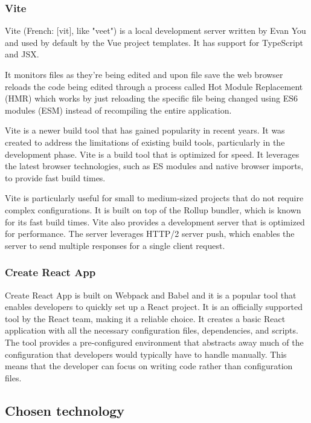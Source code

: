   \subsubsection*{Vite}
  Vite (French: [vit], like "veet") is a local development server written by Evan You and used by default by the Vue project templates. It has support for TypeScript and JSX.

  It monitors files as they're being edited and upon file save the web browser reloads the code being edited through a process called Hot Module Replacement (HMR) which works by just reloading the specific file being changed using ES6 modules (ESM) instead of recompiling the entire application.

  Vite is a newer build tool that has gained popularity in recent years. It was created to address the limitations of existing build tools, particularly in the development phase. Vite is a build tool that is optimized for speed. It leverages the latest browser technologies, such as ES modules and native browser imports, to provide fast build times.

  Vite is particularly useful for small to medium-sized projects that do not require complex configurations. It is built on top of the Rollup bundler, which is known for its fast build times. Vite also provides a development server that is optimized for performance. The server leverages HTTP/2 server push, which enables the server to send multiple responses for a single client request.

  \subsubsection*{Create React App}
  Create React App is built on Webpack and Babel and it is a popular tool that enables developers to quickly set up a React project. It is an officially supported tool by the React team, making it a reliable choice. It creates a basic React application with all the necessary configuration files, dependencies, and scripts. The tool provides a pre-configured environment that abstracts away much of the configuration that developers would typically have to handle manually. This means that the developer can focus on writing code rather than configuration files.

  \subsection*{Chosen technology}


